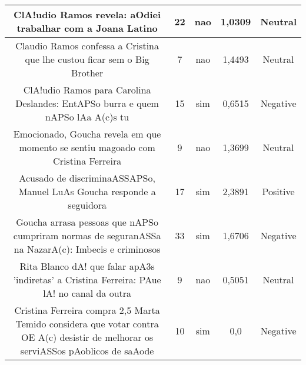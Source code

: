 \documentclass[11pt]{article}
\newlength\mylength
\begin{document}
\begin{center}
\begin{longtable}{||C{.40\mylength}||C{.20\mylength}||C{.20\mylength}||C{.30\mylength}||C{.20\mylength}||}
   ClA!udio Ramos revela: aOdiei trabalhar com a Joana Latino & 22 & nao & 1,0309 & Neutral \\  \hline
   Claudio Ramos confessa a Cristina que lhe custou ficar sem o Big Brother  & 7 & nao & 1,4493 & Neutral \\  \hline
   ClA!udio Ramos para Carolina Deslandes: EntAPSo burra e quem nAPSo lAa A(c)s tu  & 15 & sim & 0,6515 & Negative \\  \hline
   Emocionado, Goucha revela em que momento se sentiu magoado com Cristina Ferreira  & 9 & nao & 1,3699 & Neutral \\  \hline
   Acusado de discriminaASSAPSo, Manuel LuAs Goucha responde a seguidora  & 17 & sim & 2,3891 & Positive \\  \hline
   Goucha arrasa pessoas que nAPSo cumpriram normas de seguranASSa na NazarA(c): Imbecis e criminosos  & 33 & sim & 1,6706 & Negative \\  \hline
   Rita Blanco dA! que falar apA3s 'indiretas' a Cristina Ferreira: PAue lA! no canal da outra  & 9 & nao & 0,5051 & Neutral \\  \hline
   Cristina Ferreira compra 2,5%
   Marta Temido considera que votar contra OE A(c) desistir de melhorar os serviASSos pAoblicos de saAode  & 10 & sim & 0,0 & Negative \\  \hline
  
\end{longtable}
\end{center}
\end{document}
